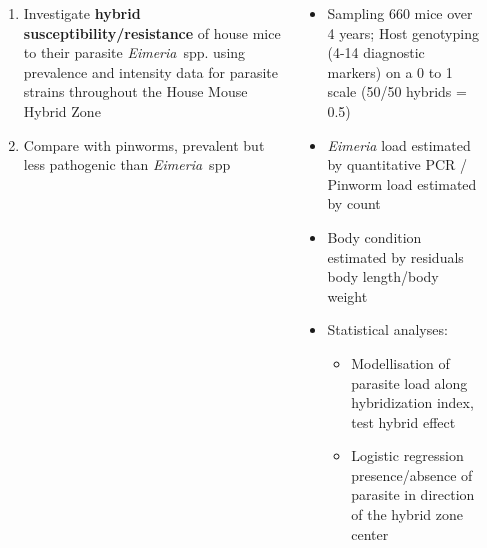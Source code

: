 \documentclass[30pt, a0paper, portrait, margin=0mm, innermargin=15mm,
               blockverticalspace=15mm, colspace=15mm, subcolspace=8mm]{tikzposter}
\begin{document}
\begin{columns}
{\begin{itemize}
        \end{itemize}
}


{
	\begin{enumerate}
	\item Investigate \textbf{hybrid susceptibility/resistance} of house mice to their parasite \textit{Eimeria}~spp. using prevalence and intensity data for parasite strains throughout the House Mouse Hybrid Zone
	\item Compare with pinworms, prevalent but less pathogenic than \textit{Eimeria}~spp
	\end{enumerate}
}


{

\begin{itemize}
\item Sampling 660 mice over 4 years; Host genotyping (4-14 diagnostic markers) on a 0 to 1 scale (50/50 hybrids = 0.5)
\item \textit{Eimeria} load estimated by quantitative PCR / Pinworm load estimated by count
\item Body condition estimated by residuals body length/body weight

\item Statistical analyses:
      \begin{itemize}
\item Modellisation of parasite load along hybridization index, test hybrid effect
\item Logistic regression presence/absence of parasite in direction of the hybrid zone center
      \end{itemize}
\end{itemize}
    }



\end{columns}
\end{document}
